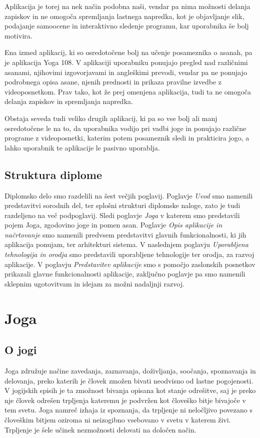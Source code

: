 \documentclass[a4paper, 12pt]{book}
\begin{document}
Aplikacija je torej na nek način podobna naši, vendar pa nima možnosti delanja zapiskov in ne omogoča spremljanja lastnega napredka, kot je objavljanje slik, podajanje samoocene in interaktivno sledenje programu, kar uporabnika še bolj motivira.

Ena izmed aplikacij, ki so osredotočene bolj na učenje posameznika o asanah, pa je aplikacija Yoga 108. V aplikaciji uporabniku ponujajo pregled nad različnimi asanami, njihovimi izgovorjavami in angleškimi prevodi, vendar pa ne ponujajo podrobnega opisa asane, njenih prednosti in prikaza pravilne izvedbe z videoposnetkom. 
Prav tako, kot že prej omenjena aplikacija, tudi ta ne omogoča delanja zapiskov in spremljanja napredka.

Obstaja seveda tudi veliko drugih aplikacij, ki pa so vse bolj ali manj osredotočene le na to, da uporabnika vodijo pri vadbi joge in ponujajo različne programe z videoposnetki, katerim potem posameznik sledi in prakticira jogo, a lahko uporabnik te aplikacije le pasivno uporablja.

\section{Struktura diplome}
Diplomsko delo smo razdelili na šest večjih poglavij. Poglavje \textit{Uvod} smo namenili predstavitvi sorodnih del, ter splošni strukturi diplomske naloge, zato je tudi razdeljeno na več podpoglavij. Sledi poglavje \textit{Joga} v katerem smo predstavili pojem Joga, zgodovino joge in pomen asan. Poglavje \textit{Opis aplikacije in načrtovanje} smo namenili predvsem predstavitvi glavnih funkcionalnosti, ki jih aplikacija ponujam, ter arhitekturi sistema. V naslednjem poglavju \textit{Uporabljena tehnologija in orodja} smo predstavili uporabljene tehnologije ter orodja, za razvoj aplikacije. V poglavju \textit{Predstavitev aplikacije} smo s pomočjo zaslonskih posnetkov prikazali glavne funkcionalnosti aplikacije, zaključno poglavje pa smo namenili sklepnim ugotovitvam in idejam za možni nadaljnji razvoj.

\chapter{Joga}
\label{ch0}

\section{O jogi}
Joga združuje načine zavedanja, zaznavanja, doživljanja, soočanja, spoznavanja in delovanja, preko katerih je človek zmožen bivati neodvisno od lastne pogojenosti. V jogijskih spisih je ta zmožnost bivanja opisana kot stanje odrešitve, saj je preko nje človek odrešen trpljenja kateremu je podvržen kot človeško bitje bivajoče v tem svetu. Joga namreč izhaja iz spoznanja, da trpljenje ni neločljivo povezano s človeškim bitjem oziroma ni neizogibno vsebovano v svetu v katerem živi. Trpljenje je šele učinek nezmožnosti delovati na določen način. \\ 
\end{document}
